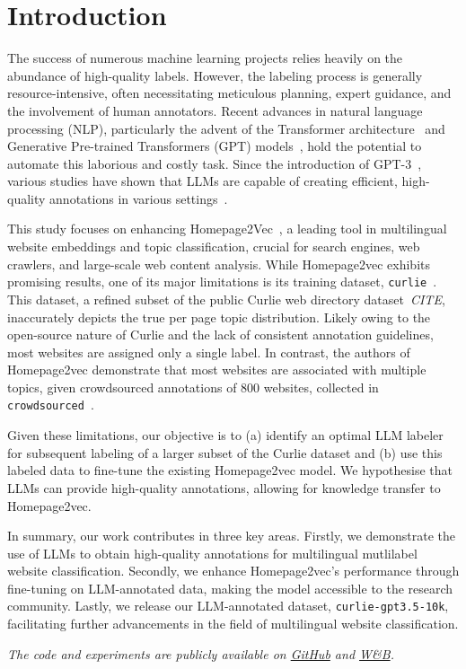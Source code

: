 \section{Introduction}

The success of numerous machine learning projects relies heavily on the abundance of high-quality labels. However, the labeling process is generally resource-intensive, often necessitating meticulous planning, expert guidance, and the involvement of human annotators. Recent advances in natural language processing (NLP), particularly the advent of the Transformer architecture~\cite{transformers} and Generative Pre-trained Transformers (GPT) models~\cite{gpt3, gpt4}, hold the potential to automate this laborious and costly task. Since the introduction of GPT-3~\cite{gpt3}, various studies have shown that LLMs are capable of creating efficient, high-quality annotations in various settings~\cite{prompt-tuning,reduce-labeling-cost,is-gpt3-good-annot, annollm}.

This study focuses on enhancing Homepage2Vec~\cite{homepage2vec}, a leading tool in multilingual website embeddings and topic classification, crucial for search engines, web crawlers, and large-scale web content analysis. While Homepage2vec exhibits promising results, one of its major limitations is its training dataset, \texttt{curlie}~\cite{homepage2vec}. This dataset, a refined subset of the public Curlie web directory dataset~\textit{CITE}, inaccurately depicts the true per page topic distribution. Likely owing to the open-source nature of Curlie and the lack of consistent annotation guidelines, most websites are assigned only a single label. In contrast, the authors of Homepage2vec demonstrate that most websites are  associated with multiple topics, given crowdsourced annotations of 800 websites, collected in \texttt{crowdsourced}~\cite{homepage2vec}.

Given these limitations, our objective is to (a) identify an optimal LLM labeler for subsequent labeling of a larger subset of the Curlie dataset and (b) use this labeled data to fine-tune the existing Homepage2vec model. We hypothesise that LLMs can provide high-quality annotations, allowing for knowledge transfer to Homepage2vec.

In summary, our work contributes in three key areas. Firstly, we demonstrate the use of LLMs to obtain high-quality annotations for multilingual mutlilabel website classification. Secondly, we enhance Homepage2vec's performance through fine-tuning on LLM-annotated data, making the model accessible to the research community. Lastly, we release our LLM-annotated dataset, \texttt{curlie-gpt3.5-10k}, facilitating further advancements in the field of multilingual website classification.

\textit{The code and experiments are publicly available on \href{https://github.com/CS-433/ml-project-2-mlp}{GitHub} and \href{https://wandb.ai/ml-project-2-mlp/homepage2vec}{W\&B}.}
